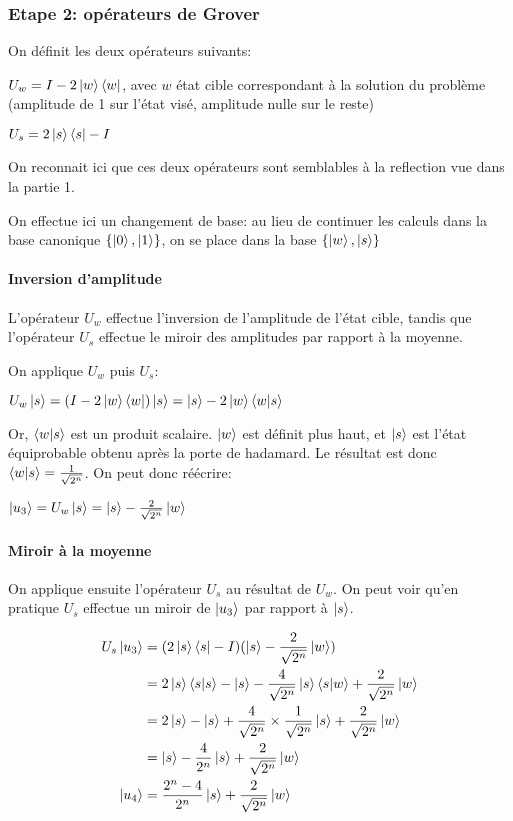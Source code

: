 \subsubsection*{Etape 2: opérateurs de Grover}

On définit les deux opérateurs suivants:

$U_w = I - 2\ket{w}\bra{w}$, avec $w$ état cible correspondant à la solution du problème (amplitude de 1 sur l'état visé, amplitude nulle sur le reste)

$U_s = 2\ket{s}\bra{s} - I$

\begin{rem}
    On reconnait ici que ces deux opérateurs sont semblables à la reflection vue dans la partie 1.
\end{rem}

\medbreak
On effectue ici un changement de base: au lieu de continuer les calculs dans la base canonique $\{\ket{0}, \ket{1}\}$, on se place dans la base $\{\ket{w}, \ket{s}\}$

\paragraph*{Inversion d'amplitude}

L'opérateur $U_w$ effectue l'inversion de l'amplitude de l'état cible, tandis que l'opérateur $U_s$ effectue le miroir des amplitudes par rapport à la moyenne.

On applique $U_w$ puis $U_s$:

$U_w \ket{s} = (I - 2 \ket{w}\bra{w})\ket{s} \nonumber = \ket{s} - 2 \ket{w}\braket{w|s}$

Or, $\braket{w|s}$ est un produit scalaire. $\ket{w}$ est définit plus haut, et $\ket{s}$ est l'état équiprobable obtenu après la porte de hadamard. Le résultat est donc $\braket{w|s} = \frac{1}{\sqrt{2^n}}$. On peut donc réécrire:

$\ket{u_3} = U_w \ket{s} = \ket{s} - \frac{2}{\sqrt{2^n}}\ket{w}$

\paragraph*{Miroir à la moyenne}
On applique ensuite l'opérateur $U_s$ au résultat de $U_w$. On peut voir qu'en pratique $U_s$ effectue un miroir de $\ket{u_3}$ par rapport à $\ket{s}$.

\begin{align}
  U_s\ket{u_3} 
  &= (2\ket{s}\bra{s} - I)(\ket{s} - \frac{2}{\sqrt{2^n}}\ket{w}) \nonumber \\
  &= 2\ket{s}\braket{s|s} - \ket{s} - \frac{4}{\sqrt{2^n}} \ket{s} \braket{s|w} + \frac{2}{\sqrt{2^n}}\ket{w} \nonumber \\
  &= 2\ket{s} - \ket{s} + \frac{4}{\sqrt{2^n}} \times \frac{1}{\sqrt{2^n}} \ket{s} + \frac{2}{\sqrt{2^n}}\ket{w} \nonumber \\
  &= \ket{s} - \frac{4}{2^n} \ket{s} + \frac{2}{\sqrt{2^n}}\ket{w} \nonumber \\
  \ket{u_4}&=\frac{2^n - 4}{2^n}\ket{s} + \frac{2}{\sqrt{2^n}}\ket{w}
\end{align}

